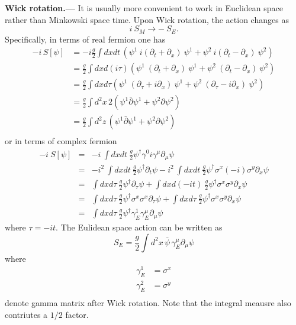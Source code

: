 \documentclass[submission, PhysLectNotes]{SciPost}
\begin{document}
{\bf Wick rotation.---}
It is usually more convenient to work in Euclidean space rather than Minkowski space time. Upon Wick rotation, the action changes as
\begin{equation}
    i\ S_M \rightarrow -\ S_E.
\end{equation}
Specifically, in terms of real fermion one has
\begin{equation}
	\begin{aligned}
		-i\,S[\psi] &= -i\frac{g}{2}\int dxdt\,\left(\psi^1\ i(\partial_t + \partial_x)\ \psi^1 + \psi^2\ i(\partial_t - \partial_x)\ \psi^2 \right)\\
		&= \frac{g}{2}\int dx d(i\tau)\left(\psi^1\ (\partial_t + \partial_x)\ \psi^1 + \psi^2\ (\partial_t - \partial_x)\ \psi^2 \right) \\
		&= \frac{g}{2}\int dx d\tau \left(\psi^1\ (\partial_\tau + i\partial_x)\ \psi^1 + \psi^2\ (\partial_\tau - i \partial_x)\ \psi^2 \right) \\
		&= \frac{g}{2}\int d^2x \,2\left(\psi^1 \bar{\partial} \psi^1 + \psi^2 \partial \psi^2 \right) \\
		&= \frac{g}{2}\int d^2z\, \left(\psi^1 \bar{\partial} \psi^1 + \psi^2 \partial \psi^2 \right) \\
	\end{aligned}
\end{equation}
or in terms of complex fermion
\begin{eqnarray}
    -i\ S[\psi] &=& -i\ \int dxdt \ \frac{g}{2} \psi^\dagger \gamma^0 i\gamma^\mu \partial_\mu \psi \nonumber \\
    &=& -i^2 \ \int dxdt \ \frac{g}{2} \psi^\dagger \partial_t \psi - i^2 \ \int dxdt \ \frac{g}{2} \psi^\dagger \sigma^x (-i) \sigma^y \partial_x \psi \nonumber \\
    &=& \int dxd\tau \ \frac{g}{2} \psi^\dagger \partial_\tau \psi + \int dxd(-i t) \ \frac{g}{2} \psi^\dagger \sigma^x \sigma^y \partial_x \psi \nonumber \\
    &=&  \int dxd\tau \ \frac{g}{2} \psi^\dagger \sigma^x\sigma^x\partial_\tau \psi + \int dxd\tau \ \frac{g}{2} \psi^\dagger \sigma^x \sigma^y \partial_x \psi \nonumber \\
    &=&  \int dxd\tau \ \frac{g}{2} \psi^\dagger \gamma^1_E\gamma^\mu_E\partial_\mu \psi
\end{eqnarray}
where $\tau = -it$. The Eulidean space action can be written as
\begin{equation}
    S_E = \frac{g}{2} \int d^2x \, \bar{\psi}\, \gamma^\mu_E\partial_\mu \psi
\end{equation}
where
\begin{equation}
	\begin{aligned}
		\gamma_E^1 &= \sigma^x \\
		\gamma_E^2 &= \sigma^y \\
	\end{aligned}
\end{equation}
denote gamma matrix after Wick rotation. Note that the integral meausre also contriutes a $1/2$ factor. 
\end{document}
